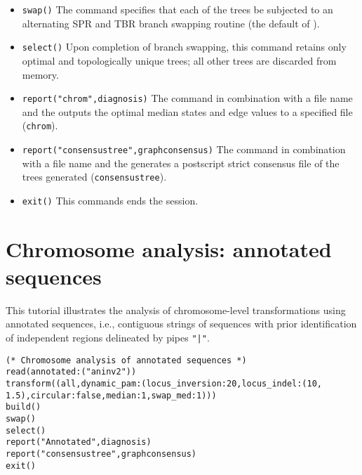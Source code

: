 \begin{itemize}
\item \texttt{swap()} The  command specifies that each of the trees be subjected to an alternating SPR and TBR branch swapping routine (the default of \poy).
\item \texttt{select()} Upon completion of branch swapping, this command retains only optimal and topologically unique trees; all other trees are discarded from memory. 
\item \texttt{report("chrom",diagnosis)}  The  command in combination with a file name and the  outputs the optimal median states and edge values to a specified file (\texttt{chrom}). 
\item \texttt{report("consensustree",graphconsensus)}  The  command in combination with a file name and the  generates a postscript strict consensus file of the trees generated (\texttt{consensustree}). 
\item \texttt{exit()} This commands ends the \poy session.
\end{itemize}

\section{Chromosome analysis: annotated sequences}{\label{tutorial4.7}}

This tutorial illustrates the analysis of chromosome-level transformations using 
annotated sequences, i.e., contiguous strings of sequences with prior 
identification of independent regions delineated by pipes  \texttt{"|"}. 

\begin{verbatim}
(* Chromosome analysis of annotated sequences *)
read(annotated:("aninv2"))
transform((all,dynamic_pam:(locus_inversion:20,locus_indel:(10,
1.5),circular:false,median:1,swap_med:1)))
build()
swap()
select()
report("Annotated",diagnosis)
report("consensustree",graphconsensus)
exit()
\end{verbatim}

